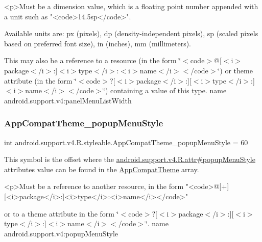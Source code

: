 \begin{DoxyVerb}      <p>Must be a dimension value, which is a floating point number appended with a unit such as "<code>14.5sp</code>".
\end{DoxyVerb}
 Available units are\+: px (pixels), dp (density-\/independent pixels), sp (scaled pixels based on preferred font size), in (inches), mm (millimeters). 

This may also be a reference to a resource (in the form \char`\"{}$<$code$>$@\mbox{[}$<$i$>$package$<$/i$>$\+:\mbox{]}$<$i$>$type$<$/i$>$\+:$<$i$>$name$<$/i$>$$<$/code$>$\char`\"{}) or theme attribute (in the form \char`\"{}$<$code$>$?\mbox{[}$<$i$>$package$<$/i$>$\+:\mbox{]}\mbox{[}$<$i$>$type$<$/i$>$\+:\mbox{]}$<$i$>$name$<$/i$>$$<$/code$>$\char`\"{}) containing a value of this type.  name android.\+support.\+v4\+:panel\+Menu\+List\+Width \mbox{\label{classandroid_1_1support_1_1v4_1_1R_1_1styleable_ae139527d680dba1ecff676f185c65505}} 
\subsubsection{\texorpdfstring{App\+Compat\+Theme\+\_\+popup\+Menu\+Style}{AppCompatTheme\_popupMenuStyle}}
{\footnotesize\ttfamily int android.\+support.\+v4.\+R.\+styleable.\+App\+Compat\+Theme\+\_\+popup\+Menu\+Style = 60\hspace{0.3cm}{\ttfamily [static]}}

This symbol is the offset where the \hyperlink{classandroid_1_1support_1_1v4_1_1R_1_1attr_a10740d726841b1c76173ce62b853748a}{android.\+support.\+v4.\+R.\+attr\#popup\+Menu\+Style} attribute\textquotesingle{}s value can be found in the \hyperlink{classandroid_1_1support_1_1v4_1_1R_1_1styleable_ac07ebbe62ed977f6dcaadc6397840ace}{App\+Compat\+Theme} array.

\begin{DoxyVerb}      <p>Must be a reference to another resource, in the form "<code>@[+][<i>package</i>:]<i>type</i>:<i>name</i></code>"
\end{DoxyVerb}
 or to a theme attribute in the form \char`\"{}$<$code$>$?\mbox{[}$<$i$>$package$<$/i$>$\+:\mbox{]}\mbox{[}$<$i$>$type$<$/i$>$\+:\mbox{]}$<$i$>$name$<$/i$>$$<$/code$>$\char`\"{}.  name android.\+support.\+v4\+:popup\+Menu\+Style \mbox{\label{classandroid_1_1support_1_1v4_1_1R_1_1styleable_a36a238eb7c745d998ccfc9bd0e0d4e8c}} 
